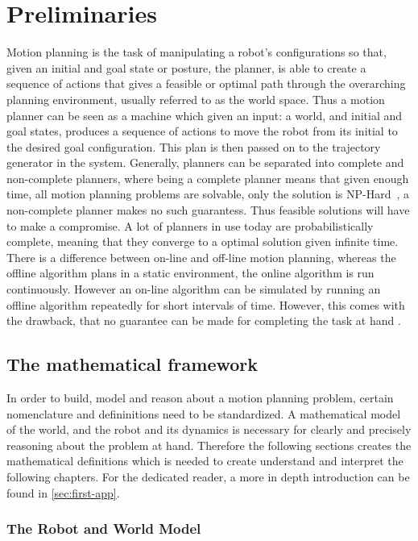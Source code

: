 \chapter{Preliminaries}
\label{chp:preliminaries}

Motion planning is the task of manipulating a robot's configurations so that,
given an initial and goal state or posture, the planner, is able to create a
sequence of actions that gives a feasible or optimal path through the
overarching planning environment, usually referred to as the world space. Thus a
motion planner can be seen as a machine which given an input: a world, and
initial and goal states, produces a sequence of actions to move the robot from
its initial to the desired goal configuration. This plan is then passed on to
the trajectory generator in the system. Generally, planners can be separated
into complete and non-complete planners, where being a complete planner means
that given enough time, all motion planning problems are solvable, only the
solution is NP-Hard~\cite{Lav06}, a non-complete planner makes no such
guarantess. Thus feasible solutions will have to make a compromise. A lot of
planners in use today are probabilistically complete, meaning that they converge
to a optimal solution given infinite time. There is a difference between on-line
and off-line motion planning, whereas the offline algorithm plans in a static
environment, the online algorithm is run continuously. However an on-line
algorithm can be simulated by running an offline algorithm repeatedly for short
intervals of time. However, this comes with the drawback, that no guarantee can
be made for completing the task at hand \cite{Lav06}.

\section{The mathematical framework}

In order to build, model and reason about a motion planning problem, certain
nomenclature and defininitions need to be standardized. A mathematical model of
the world, and the robot and its dynamics is necessary for clearly and precisely
reasoning about the problem at hand. Therefore the following sections creates
the mathematical definitions which is needed to create understand and interpret
the following chapters. For the dedicated reader, a more in depth introduction
can be found in \cref{sec:first-app}.

\subsection{The Robot and World Model}

